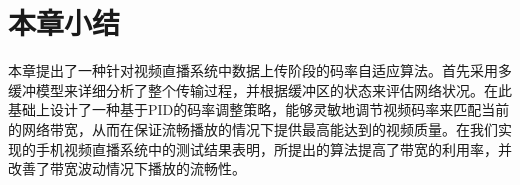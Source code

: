 \section{本章小结}

本章提出了一种针对视频直播系统中数据上传阶段的码率自适应算法。首先采用多缓冲模型来详细分析了整个传输过程，并根据缓冲区的状态来评估网络状况。在此基础上设计了一种基于PID的码率调整策略，能够灵敏地调节视频码率来匹配当前的网络带宽，从而在保证流畅播放的情况下提供最高能达到的视频质量。在我们实现的手机视频直播系统中的测试结果表明，所提出的算法提高了带宽的利用率，并改善了带宽波动情况下播放的流畅性。